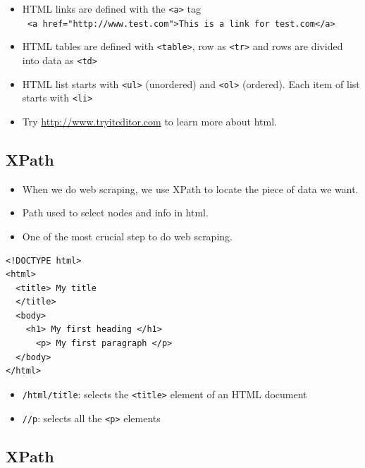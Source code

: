 \begin{itemize}
\item
  HTML links are defined with the \texttt{\textless{}a\textgreater{}}
  tag
  \texttt{\ \textless{}a\ href="http://www.test.com"\textgreater{}This\ is\ a\ link\ for\ test.com\textless{}/a\textgreater{}}
\item
  HTML tables are defined with \texttt{\textless{}table\textgreater{}},
  row as \texttt{\textless{}tr\textgreater{}} and rows are divided into
  data as \texttt{\textless{}td\textgreater{}}
\item
  HTML list starts with \texttt{\textless{}ul\textgreater{}} (unordered)
  and \texttt{\textless{}ol\textgreater{}} (ordered). Each item of list
  starts with \texttt{\textless{}li\textgreater{}}
\item
  Try \url{http://www.tryiteditor.com} to learn more about html.
\end{itemize}

\subsection{XPath}\label{xpath}

\begin{itemize}
\item
  When we do web scraping, we use XPath to locate the piece of data we
  want.
\item
  Path used to select nodes and info in html.
\item
  One of the most crucial step to do web scraping.
\end{itemize}

\begin{verbatim}
<!DOCTYPE html>
<html>
  <title> My title
  </title>
  <body>
    <h1> My first heading </h1>
      <p> My first paragraph </p>
  </body>
</html>
\end{verbatim}

\begin{itemize}
\tightlist
\item
  \texttt{/html/title}: selects the
  \texttt{\textless{}title\textgreater{}} element of an HTML document
\item
  \texttt{//p}: selects all the \texttt{\textless{}p\textgreater{}}
  elements
\end{itemize}

\subsection{XPath}\label{xpath-1}

